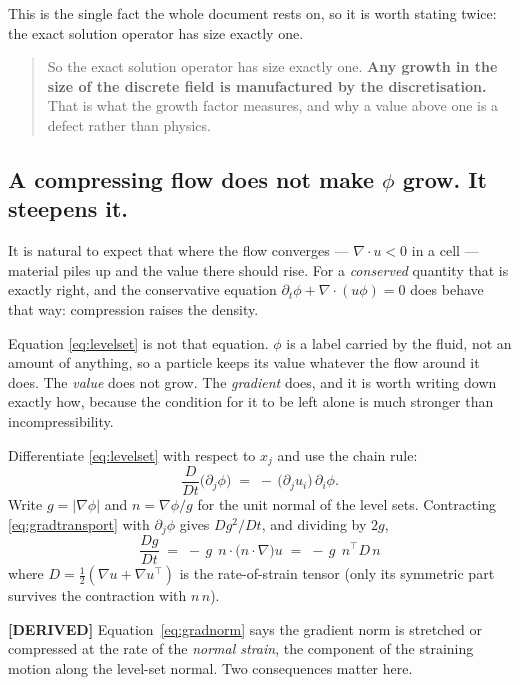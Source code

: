 \documentclass[11pt,a4paper]{article}
\newcommand{\derived}{\textcolor{blue!50!black}{\textbf{[DERIVED]}}}
\begin{document}
This is the single fact the whole document rests on, so it is worth stating twice: the exact
solution operator has size exactly one.

\begin{quote}
So the exact solution operator has size exactly one. \textbf{Any growth in the size of the
discrete field is manufactured by the discretisation.} That is what the growth factor measures,
and why a value above one is a defect rather than physics.
\end{quote}

\subsection{A compressing flow does not make \texorpdfstring{$\phi$}{phi} grow. It steepens it.}

It is natural to expect that where the flow converges --- \(\nabla\cdot u < 0\) in a cell ---
material piles up and the value there should rise. For a \emph{conserved} quantity that is
exactly right, and the conservative equation \(\partial_t\phi + \nabla\cdot(u\phi) = 0\) does
behave that way: compression raises the density.

Equation \eqref{eq:levelset} is not that equation. \(\phi\) is a label carried by the fluid, not
an amount of anything, so a particle keeps its value whatever the flow around it does. The
\emph{value} does not grow. The \emph{gradient} does, and it is worth writing down exactly how,
because the condition for it to be left alone is much stronger than incompressibility.

Differentiate \eqref{eq:levelset} with respect to \(x_j\) and use the chain rule:
\begin{equation}
  \frac{D}{Dt}\bigl(\partial_j \phi\bigr) \;=\; -\,\bigl(\partial_j u_i\bigr)\,\partial_i \phi .
  \label{eq:gradtransport}
\end{equation}
Write \(g = |\nabla\phi|\) and \(n = \nabla\phi/g\) for the unit normal of the level sets.
Contracting \eqref{eq:gradtransport} with \(\partial_j\phi\) gives \(Dg^2/Dt\), and dividing by
\(2g\),
\begin{equation}
  \boxed{\;\frac{Dg}{Dt} \;=\; -\,g\;\, n\cdot\bigl(n\cdot\nabla\bigr)u
        \;=\; -\,g\;\, n^{\!\top} D\, n\;}
  \label{eq:gradnorm}
\end{equation}
where \(D = \tfrac12(\nabla u + \nabla u^{\!\top})\) is the rate-of-strain tensor (only its
symmetric part survives the contraction with \(n\,n\)).

\derived{} Equation~\eqref{eq:gradnorm} says the gradient norm is stretched or compressed at the
rate of the \emph{normal strain}, the component of the straining motion along the level-set
normal. Two consequences matter here.
\end{document}
